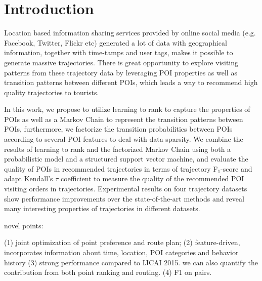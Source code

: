 \section{Introduction}
\label{sec:introduction}
Location based information sharing services provided by online social media
(e.g. Facebook, Twitter, Flickr etc) generated a lot of data with geographical information,
together with time-tamps and user tags, makes it possible to generate massive trajectories.
There is great opportunity to explore visiting patterns from these trajectory data by leveraging POI properties
as well as transition patterns between different POIs, which leads a way to recommend high quality trajectories to tourists.

In this work, we propose to utilize learning to rank to capture the properties of POIs as well as a Markov Chain to
represent the transition patterns between POIs, furthermore, we factorize the transition probabilities between POIs
according to several POI features to deal with data sparsity.
We combine the results of learning to rank and the factorized Markov Chain using both a probabilistic model and a structured
support vector machine, and evaluate the quality of POIs in recommended trajectories in terms of trajectory F$_1$-score\cite{ijcai15} and
adapt Kendall's $\tau$ coefficient\cite{kendalltau} to measure the quality of the recommended POI visiting orders in trajectories.
Experimental results on four trajectory datasets show performance improvements over the state-of-the-art methods and
reveal many interesting properties of trajectories in different datasets.


novel points:

(1) joint optimization of point preference and route plan;
(2) feature-driven, incorporates information about time, location, POI categories and behavior history
(3) strong performance compared to IJCAI 2015. we can also quantify the contribution from both point ranking and routing.
(4) F1 on pairs.

